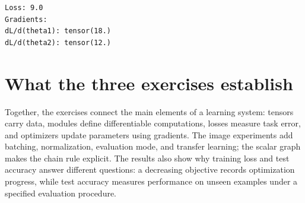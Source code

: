 \documentclass[../labs.tex]{subfiles}
\begin{document}
\label{res:lab01_cell_084}

\begin{lstlisting}[style=terminalOutput]
Loss: 9.0
Gradients:
dL/d(theta1): tensor(18.)
dL/d(theta2): tensor(12.)
\end{lstlisting}
\section{What the three exercises establish}

Together, the exercises connect the main elements of a learning system: tensors carry data, modules define differentiable computations, losses measure task error, and optimizers update parameters using gradients. The image experiments add batching, normalization, evaluation mode, and transfer learning; the scalar graph makes the chain rule explicit. The results also show why training loss and test accuracy answer different questions: a decreasing objective records optimization progress, while test accuracy measures performance on unseen examples under a specified evaluation procedure.
\end{document}
